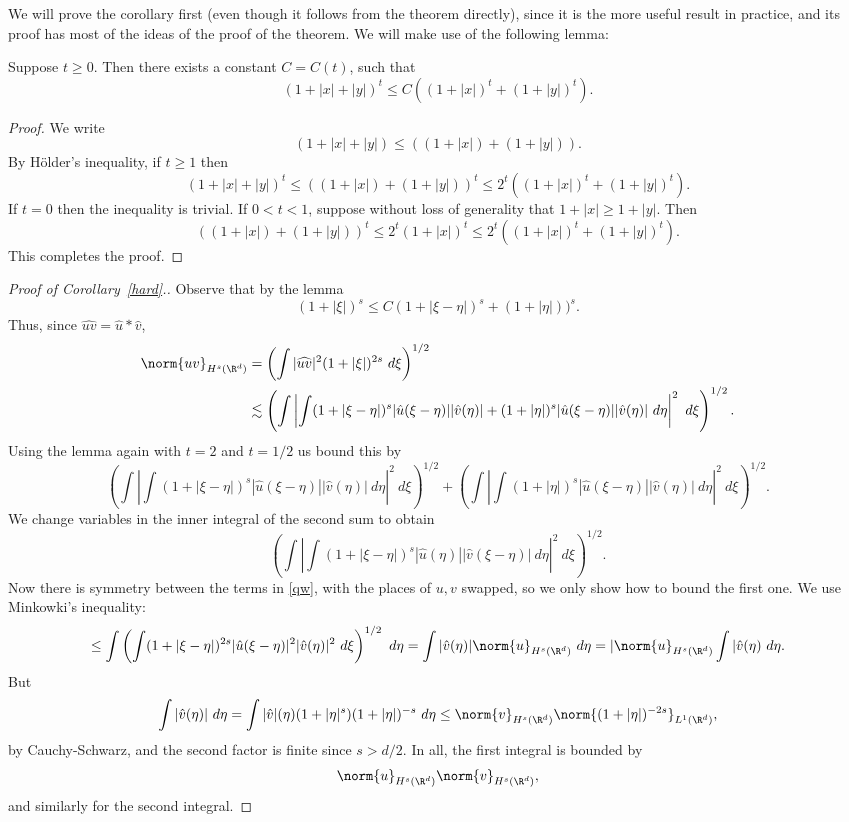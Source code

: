 \documentclass[12pt]{article}
\begin{document}
We will prove the corollary first (even though it follows from the theorem directly), since it is the more useful result in practice, and its proof has most of the ideas of the proof of the theorem. We will make use of the following lemma:
\begin{lem}\label{one}Suppose $t \geq 0$. Then there exists a constant $C = C(t)$, such that
\[(1+|x|+|y|)^{t} \leq C((1+|x|)^t + (1+|y|)^t).\]\end{lem}
\begin{proof} We write
\[(1+|x|+|y|) \leq ((1+|x|)+(1+|y|)).\] 
By H\"older's inequality, if $t \geq 1$ then
\[(1+|x|+|y|)^t \leq ((1+|x|)+(1+|y|))^t \leq 2^t((1+|x|)^t+(1+|y|)^t).\]
If $t = 0$ then the inequality is trivial. If $0 < t < 1$, suppose without loss of generality that $1+|x| \geq 1+|y|$. Then
\[((1+|x|)+(1+|y|))^t \leq 2^t(1+|x|)^t \leq 2^t((1+|x|)^t+(1+|y|)^t).\] This completes the proof.\end{proof}
\begin{proof}[Proof of Corollary~\ref{hard}.]Observe that by the lemma
\[(1+|\xi|)^s \leq C(1+|\xi-\eta|)^s+(1+|\eta|))^s.\] Thus, since $\widehat{uv} = \hat{u}\ast\hat{v}$,
\begin{align*}
\norm{uv}_{H^s(\R^d)} &= \left(\int |\widehat{uv}|^2(1+|\xi|)^{2s}\ d\xi\right)^{1/2}\\
&\lesssim\left(\int \left|\int (1+|\xi-\eta|)^s|\hat{u}(\xi-\eta)||\hat{v}(\eta)|+ (1+|\eta|)^s|\hat{u}(\xi-\eta)||\hat{v}(\eta)|\ d\eta\right|^2\ d\xi\right)^{1/2}.\end{align*}
Using the lemma again with $t=2$ and $t=1/2$ us bound this by
\begin{equation}\label{qw}\left(\int \left|\int (1+|\xi-\eta|)^s|\hat{u}(\xi-\eta)||\hat{v}(\eta)|\ d\eta\right|^2\ d\xi\right)^{1/2}+\left(\int \left|\int (1+|\eta|)^s|\hat{u}(\xi-\eta)||\hat{v}(\eta)|\ d\eta\right|^2\ d\xi\right)^{1/2}.\end{equation}
We change variables in the inner integral of the second sum to obtain
\[\left(\int \left|\int (1+|\xi-\eta|)^s|\hat{u}(\eta)||\hat{v}(\xi-\eta)|\ d\eta\right|^2\ d\xi\right)^{1/2}.\] Now there is symmetry between the terms in \eqref{qw}, with the places of $u,v$ swapped, so we only show how to bound the first one. We use Minkowki's inequality:
\[\leq \int\left(\int (1+|\xi-\eta|)^{2s}|\hat{u}(\xi-\eta)|^2|\hat{v}(\eta)|^2\ d\xi\right)^{1/2}\ d\eta = \int |\hat{v}(\eta)|\norm{u}_{H^s(\R^d)}\ d\eta = |\norm{u}_{H^s(\R^d)}\int |\hat{v}(\eta)\ d\eta.\]
But
\[\int |\hat{v}(\eta)|\ d\eta = \int |\hat{v}|(\eta)(1+|\eta|^{s})(1+|\eta|)^{-s}\ d\eta \leq \norm{v}_{H^s(\R^d)}\norm{(1+|\eta|)^{-2s}}_{L^1(\R^d)},\]
by Cauchy-Schwarz, and the second factor is finite since $s > d/2$. In all, the first integral is bounded by
\[\norm{u}_{H^s(\R^d)}\norm{v}_{H^s(\R^d)},\] and similarly for the second integral.\end{proof}
\end{document}
